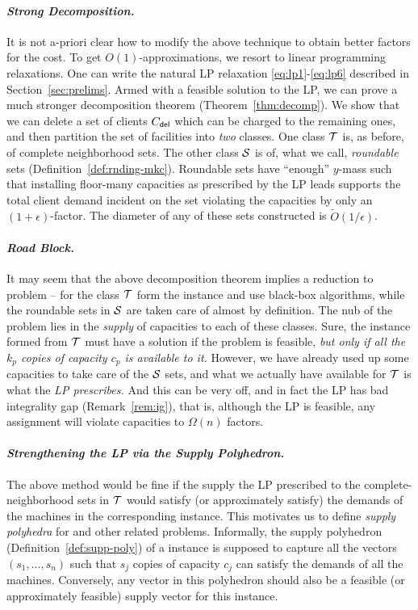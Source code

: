 \paragraph{\emph{Strong Decomposition.}}
It is not a-priori clear how to modify the above technique to obtain better factors for the cost. To get $O(1)$-approximations, we resort to linear programming relaxations. One can write the natural LP relaxation \eqref{eq:lp1}-\eqref{eq:lp6} described in Section~\ref{sec:prelims}.
Armed with a feasible solution to the LP, we can prove a much stronger decomposition theorem (Theorem~\ref{thm:decomp}). We show that we can delete a set of clients $C_{\mathsf{del}}$ which can be charged to the remaining ones, and then partition the set of facilities into {\em two} classes.
One class ${\cal T}$  is, as before, of complete neighborhood sets. The other class ${\cal S}$  is of, what we call, {\em roundable} sets (Definition~\ref{def:rnding-mkc}). Roundable sets have ``enough'' $y$-mass such that installing floor-many capacities as prescribed by the LP leads supports the total client demand incident on the set violating the capacities by only an $(1+\epsilon)$-factor. The diameter of any of these sets constructed is $\tilde{O}(1/\epsilon)$. 

\paragraph{\emph{Road Block.}}
It may seem that the above decomposition theorem implies a reduction to \cckp problem -- for the class ${\cal T}$ form the \cckp instance and use black-box algorithms, while the roundable sets in ${\cal S}$ are taken care of almost by definition.
The nub of the problem lies in the {\em supply} of capacities to each of these classes.  Sure, the \cckp instance formed from ${\cal T}$ must have a solution if the \mckc problem is feasible, {\em but only if all the $k_p$ copies of capacity $c_p$ is available to it.} However, we have already used up some capacities to take care of the ${\cal S}$ sets, and what we actually have available for ${\cal T}$ is what the {\em LP prescribes.} And this can be very off, and in fact the LP has bad integrality gap (Remark~\ref{rem:ig}), that is, although the LP is feasible, any assignment will violate capacities to $\Omega(n)$ factors.%

\paragraph{\emph{Strengthening the LP via the Supply Polyhedron.}}
The above method would be fine if the supply the LP prescribed to the complete-neighborhood sets in ${\cal T}$ would satisfy (or approximately satisfy) the demands of the machines in the corresponding \cckp instance. This motivates us  to define {\em supply polyhedra} for \cckp and other related problems. Informally, the supply polyhedron (Definition~\ref{def:supp-poly}) of a \cckp instance is supposed to capture all the vectors $(s_1,\ldots,s_n)$ such that $s_j$ copies of capacity $c_j$ can satisfy the demands of all the machines. Conversely, any vector in this polyhedron should also be a feasible (or approximately feasible) supply vector for this instance.

